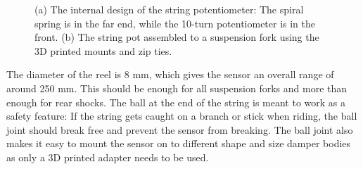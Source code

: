 \documentclass[a4paper,11pt]{article} %
\begin{document}
\begin{figure}[H]
    \hfill
    \hfill
    \hfill
    \caption{(a) The internal design of the string potentiometer: The spiral spring is in the far end, while the 10-turn potentiometer is in the front. (b) The string pot assembled to a suspension fork using the 3D printed mounts and zip ties.}
    \label{fig:string_pots}
\end{figure}

The diameter of the reel is 8 mm, which gives the sensor an overall range of around 250 mm. This should be enough for all suspension forks and more than enough for rear shocks. The ball at the end of the string is meant to work as a safety feature: If the string gets caught on a branch or stick when riding, the ball joint should  break free and prevent the sensor from breaking. The ball joint also makes it easy to mount the sensor on to different shape and size damper bodies as only a 3D printed adapter needs to be used.
\end{document}

